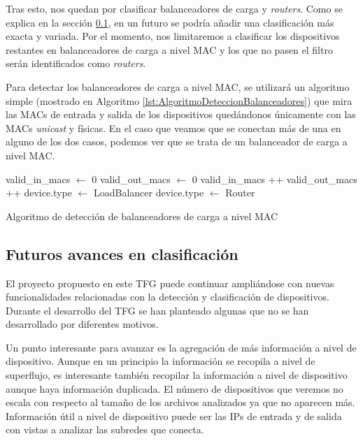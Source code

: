 \documentclass[twoside, 12pt]{epstfg}
\begin{document}
Tras esto, nos quedan por clasificar balanceadores de carga y \textit{routers}. Como se explica en la sección \ref{subsec:Analisis:Dispositivos:Futuro}, en un futuro se podría añadir una clasificación más exacta y variada. Por el momento, nos limitaremos a clasificar los dispositivos restantes en balanceadores de carga a nivel MAC y los que no pasen el filtro serán identificados como \textit{routers}.

Para detectar los balanceadores de carga a nivel MAC, se utilizará un algoritmo simple (mostrado en Algoritmo \ref{lst:AlgoritmoDeteccionBalanceadores}) que mira las MACs de entrada y salida de los dispositivos quedándonos únicamente con las MACs \textit{unicast} y físicas. En el caso que veamos que se conectan más de una en alguno de los dos casos, podemos ver que se trata de un balanceador de carga a nivel MAC.
\begin{algorithm}[btp]
\begin{algorithmic}
\State valid\_in\_macs $\gets$ 0
\State valid\_out\_macs $\gets$ 0
            \State valid\_in\_macs ++
        \EndIf
    \EndFor
            \State valid\_out\_macs ++
        \EndIf
    \EndFor
        \State device.type $\gets$ LoadBalancer
    \Else
        \State device.type $\gets$ Router
    \EndIf
\EndFor
\EndFunction
\end{algorithmic}
\caption{Algoritmo de detección de balanceadores de carga a nivel MAC}
\label{lst:AlgoritmoDeteccionBalanceadores}
\end{algorithm}

\subsection{Futuros avances en clasificación}
\label{subsec:Analisis:Dispositivos:Futuro}
El proyecto propuesto en este TFG puede continuar ampliándose con nuevas funcionalidades relacionadas con la detección y clasificación de dispositivos. Durante el desarrollo del TFG se han planteado algunas que no se han desarrollado por diferentes motivos.

Un punto interesante para avanzar es la agregación de más información a nivel de dispositivo. Aunque en un principio la información se recopila a nivel de superflujo, es interesante también recopilar la información a nivel de dispositivo aunque haya información duplicada. El número de dispositivos que veremos no escala con respecto al tamaño de los archivos analizados ya que no aparecen más. Información útil a nivel de dispositivo puede ser las IPs de entrada y de salida con vistas a analizar las subredes que conecta.
\end{document}
